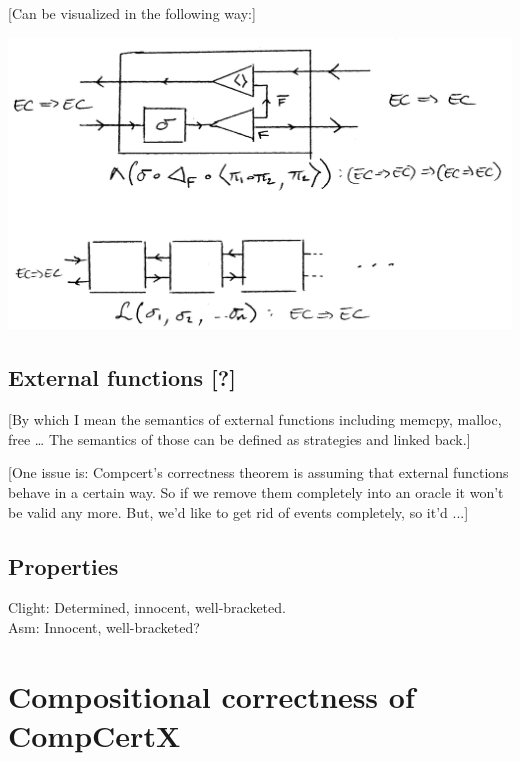 \documentclass[acmsmall,anonymous]{acmart}
\begin{document}
[Can be visualized in the following way:]
\begin{center}
  \includegraphics[scale=0.5]{linking-operator}
\end{center}


\subsection{External functions [?]} %

[By which I mean the semantics of external functions
including memcpy, malloc, free \ldots
The semantics of those can be defined as strategies
and linked back.]

[One issue is:
Compcert's correctness theorem is
assuming that external functions behave in a certain way.
So if we remove them completely into an oracle
it won't be valid any more.
But,
we'd like to get rid of events completely,
so it'd ...]


\subsection{Properties} %

Clight: Determined, innocent, well-bracketed. \\
Asm: Innocent, well-bracketed?



\newpage
\section{Compositional correctness of CompCertX} %
\end{document}
